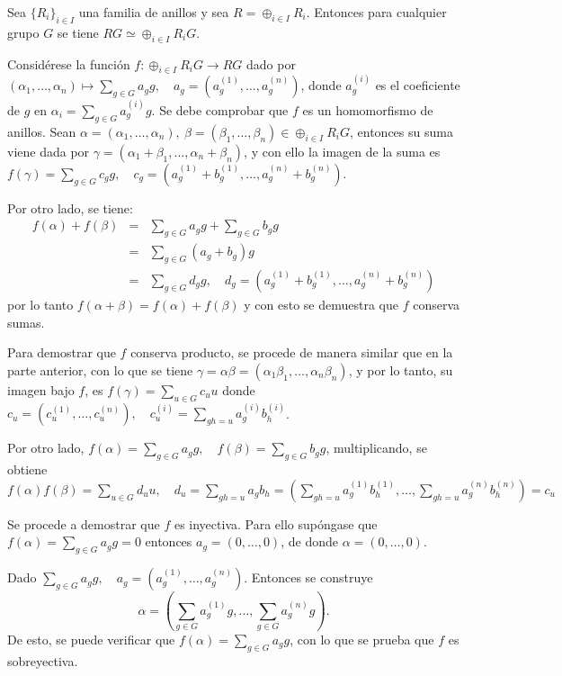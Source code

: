 \begin{lema}\label{lema2}
Sea $\{R_i\}_{i\in I}$ una familia de anillos y sea $R = \oplus_{i \in I}R_i$. Entonces para cualquier grupo $G$ se tiene $RG \simeq \oplus_{i \in I}R_iG$.
\end{lema}
\newpage
\begin{proof*}
Considérese la función $f \colon \oplus_{i \in I}R_iG \to RG$ dado por $(\alpha_1, \dots, \alpha_n) \mapsto \sum_{g \in G}a_gg, \quad a_g = (a_g^{(1)}, \dots, a_g ^{(n)})$, donde $a_g^{(i)}$ es el coeficiente de $g$ en $\alpha_i = \sum_{g \in G}a_g^{(i)}g$. Se debe comprobar que $f$ es un homomorfismo de anillos.
Sean $\alpha = (\alpha_1, \dots, \alpha_n), \  \beta = (\beta_1, \dots, \beta_n) \in \oplus_{i \in I}R_iG$, entonces su suma viene dada por $\gamma = (\alpha_1 + \beta_1, \dots, \alpha_n + \beta_n)$, y con ello la imagen de la suma es $f(\gamma) = \sum_{g \in G}c_gg, \quad c_g = (a_g^{(1)}+b_g^{(1)}, \dots, a_g^{(n)}+b_g^{(n)})$. 

Por otro lado, se tiene:
\begin{eqnarray*}
f(\alpha) + f(\beta) &=& \sum_{g \in G}a_gg + \sum_{g\in G}b_gg\\
 &=& \sum_{g \in G}(a_g + b_g)g \\
  & = &  \sum_{g \in G}d_gg, \quad d_g = (a_g^{(1)} + b_g^{(1)}, \dots, a_g^{(n)} + b_g^{(n)} )
\end{eqnarray*}
por lo tanto $f(\alpha + \beta) = f(\alpha) + f(\beta)$ y con esto se demuestra que $f$ conserva sumas.

Para demostrar que $f$ conserva producto, se procede de manera similar que en la parte anterior, con lo que se  tiene $\gamma = \alpha\beta = (\alpha_1\beta_1, \dots, \alpha_n\beta_n)$, y por lo tanto, su imagen bajo $f$, es $f(\gamma) = \sum_{u \in G}c_uu$ donde $c_u = (c_u^{(1)}, \dots, c_u^{(n)}), \quad c_u^{(i)} = \sum_{gh=u}a_g^{(i)}b_h^{(i)}$.

Por otro lado, $f(\alpha) = \sum_{g \in G}a_gg, \quad f(\beta) = \sum_{g \in G}b_gg$, multiplicando, se obtiene $f(\alpha)f(\beta) = \sum_{u \in G}d_uu, \quad d_u = \sum_{gh = u }a_gb_h = \left( \sum_{gh=u}a_g^{(1)}b_h^{(1)}, \dots, \sum_{gh=u}a_g^{(n)}b_h^{(n) } \right)=c_u$

Se procede a demostrar que $f$ es inyectiva. Para ello supóngase que $f(\alpha) = \sum_{g\in G}a_gg = 0$ entonces $a_g = (0, \dots, 0)$, de donde $\alpha = (0, \dots, 0)$. 

Dado $\sum_{g \in G}a_gg, \quad a_g = (a_g^{(1)}, \dots, a_g^{(n)})$. Entonces se construye \[\alpha= \left( \sum_{g\in G}a_g^{(1)}g, \dots, \sum_{g\in G}a_g^{(n)}g  \right).\] De esto, se puede verificar que $f(\alpha) = \sum_{g \in G}a_gg$, con lo que se prueba que $f$ es sobreyectiva. \qedhere
\end{proof*}
